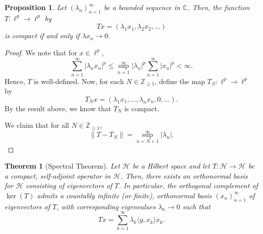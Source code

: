 \documentclass[a4paper, openany]{memoir}
\theoremstyle{definition}
\theoremstyle{plain}
\newtheorem{theorem}[definition]{Theorem}
\newtheorem{proposition}[definition]{Proposition}
\begin{document}
    \begin{proposition}
        Let $(\lambda_n)_{n=1}^\infty$ be a bounded sequence in $\mathbb{C}$. Then, the function $T \colon \ell^p \to \ell^p$ by 
        \[Tx = (\lambda_1x_1, \lambda_2x_2, \dots)\]
        is compact if and only if $\lambda x_n \to 0$.
    \end{proposition}
    \begin{proof}
        We note that for $x \in \ell^p$,
        \[\sum_{n=1}^\infty |\lambda_n x_n|^p \leq \sup_{n=1}^\infty |\lambda_n|^p \sum_{n=1}^\infty |x_n|^p < \infty.\]
        Hence, $T$ is well-defined. Now, for each $N \in \mathbb{Z}_{\geq 1}$, define the map $T_N \colon \ell^p \to \ell^p$ by 
        \[T_N x = (\lambda_1 x_1, \dots, \lambda_n x_n, 0, \dots).\]
        By the result above, we know that $T_N$ is compact. 

        We claim that for all $N \in \mathbb{Z}_{\geq 1}$,
        \[\lVert T - T_N \rVert = \sup_{n=N+1}^\infty |\lambda_n|.\]

    \end{proof}

    \begin{theorem}[Spectral Theorem]
        Let $\mathcal{H}$ be a Hilbert space and let $T \colon \mathcal{H} \to \mathcal{H}$ be a compact, self-adjoint operator in $\mathcal{H}$. Then, there exists an orthonormal basis for $\mathcal{H}$ consisting of eigenvectors of $T$. In particular, the orthogonal complement of $\ker (T)$ admits a countably infinite (or finite), orthonormal basis $(x_n)_{n=1}^\infty$ of eigenvectors of $T$, with corresponding eigenvalues $\lambda_n \to 0$ such that 
        \[Tx = \sum_{k=1}^\infty \lambda_k \langle y, x_k \rangle x_k.\]
    \end{theorem}
\end{document}
